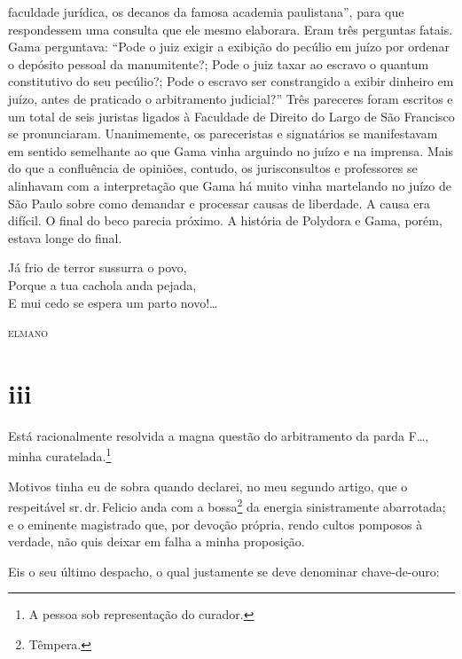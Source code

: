\begin{didascalia}
{faculdade jurídica, os decanos da famosa academia paulistana'', para que
respondessem uma consulta que ele mesmo elaborara. Eram três perguntas
fatais. Gama perguntava: ``Pode o juiz exigir a exibição do pecúlio em
juízo por ordenar o depósito pessoal da manumitente?; Pode o juiz taxar
ao escravo o quantum constitutivo do seu pecúlio?; Pode o escravo ser
constrangido a exibir dinheiro em juízo, antes de praticado o
arbitramento judicial?'' Três pareceres foram escritos e um total de seis
juristas ligados à Faculdade de Direito do Largo de São Francisco se
pronunciaram. Unanimemente, os pareceristas e signatários se
manifestavam em sentido semelhante ao que Gama vinha arguindo no juízo e
na imprensa. Mais do que a confluência de opiniões, contudo, os
jurisconsultos e professores se alinhavam com a interpretação que Gama
há muito vinha martelando no juízo de São Paulo sobre como demandar e
processar causas de liberdade. A causa era difícil. O final do beco
parecia próximo. A história de Polydora e Gama, porém, estava longe do
final.}
\end{didascalia}

\epigraph{Já frio de terror sussurra o povo,\\
Porque a tua cachola anda pejada,\footnotemark\\
E mui cedo se espera um parto novo!\ldots{}}{\textsc{elmano}\footnotemark}



\section{iii}

Está racionalmente resolvida a magna questão do arbitramento da parda
F\ldots{}, minha curatelada.\footnote{ A pessoa sob representação do
  curador.}

Motivos tinha eu de sobra quando declarei, no meu segundo artigo, que o
respeitável sr.\,dr.\,Felicio anda com a bossa\footnote{ Têmpera.} da
energia sinistramente abarrotada; e o eminente magistrado que, por
devoção própria, rendo cultos pomposos à verdade, não quis deixar em
falha a minha proposição.

Eis o seu último despacho, o qual justamente se deve denominar
chave-de-ouro:

